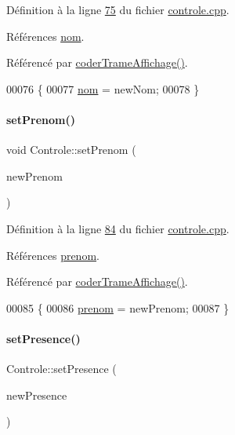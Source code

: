 Définition à la ligne \hyperlink{controle_8cpp_source_l00075}{75} du fichier \hyperlink{controle_8cpp_source}{controle.\+cpp}.



Références \hyperlink{controle_8h_source_l00073}{nom}.



Référencé par \hyperlink{controle_8cpp_source_l00101}{coder\+Trame\+Affichage()}.


\begin{DoxyCode}
00076 \{
00077     \hyperlink{class_controle_ad47747a49ca21434f6d43d451d3cf134}{nom} = newNom;
00078 \}
\end{DoxyCode}
\mbox{\label{class_controle_ab046adc050872b4034c1500eb2e1b728}} 
\paragraph{\texorpdfstring{set\+Prenom()}{setPrenom()}}
{\footnotesize\ttfamily void Controle\+::set\+Prenom (\begin{DoxyParamCaption}\item[{Q\+String}]{new\+Prenom }\end{DoxyParamCaption})}



Définition à la ligne \hyperlink{controle_8cpp_source_l00084}{84} du fichier \hyperlink{controle_8cpp_source}{controle.\+cpp}.



Références \hyperlink{controle_8h_source_l00074}{prenom}.



Référencé par \hyperlink{controle_8cpp_source_l00101}{coder\+Trame\+Affichage()}.


\begin{DoxyCode}
00085 \{
00086     \hyperlink{class_controle_a29e37e25a6fd4643ddea3fef47e3bc51}{prenom} = newPrenom;
00087 \}
\end{DoxyCode}
\mbox{\label{class_controle_a65904fe693663759a4cde4e4d66e36e8}} 
\paragraph{\texorpdfstring{set\+Presence()}{setPresence()}}
{\footnotesize\ttfamily Controle\+::set\+Presence (\begin{DoxyParamCaption}\item[{bool}]{new\+Presence }\end{DoxyParamCaption})}



